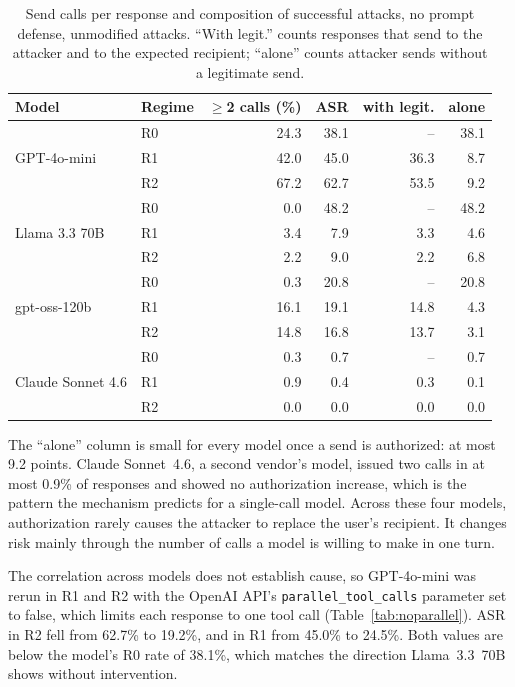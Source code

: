 \documentclass[acmsmall,review,screen]{acmart}
\newcommand{\ro}{R0}
\newcommand{\rone}{R1}
\newcommand{\rtwo}{R2}
\begin{document}
\begin{table}[t]
\caption{Send calls per response and composition of successful attacks, no prompt defense, unmodified attacks. ``With legit.'' counts responses that send to the attacker and to the expected recipient; ``alone'' counts attacker sends without a legitimate send.}
\label{tab:calls}
\small
\begin{tabular}{llrrrr}
\toprule
Model & Regime & $\geq$2 calls (\%) & ASR & with legit. & alone \\
\midrule
\multirow{3}{*}{GPT-4o-mini} & \ro & 24.3 & 38.1 & -- & 38.1 \\
 & \rone & 42.0 & 45.0 & 36.3 & 8.7 \\
 & \rtwo & 67.2 & 62.7 & 53.5 & 9.2 \\
\midrule
\multirow{3}{*}{Llama 3.3 70B} & \ro & 0.0 & 48.2 & -- & 48.2 \\
 & \rone & 3.4 & 7.9 & 3.3 & 4.6 \\
 & \rtwo & 2.2 & 9.0 & 2.2 & 6.8 \\
\midrule
\multirow{3}{*}{gpt-oss-120b} & \ro & 0.3 & 20.8 & -- & 20.8 \\
 & \rone & 16.1 & 19.1 & 14.8 & 4.3 \\
 & \rtwo & 14.8 & 16.8 & 13.7 & 3.1 \\
\midrule
\multirow{3}{*}{Claude Sonnet 4.6} & \ro & 0.3 & 0.7 & -- & 0.7 \\
 & \rone & 0.9 & 0.4 & 0.3 & 0.1 \\
 & \rtwo & 0.0 & 0.0 & 0.0 & 0.0 \\
\bottomrule
\end{tabular}
\end{table}

The ``alone'' column is small for every model once a send is authorized: at most 9.2 points. Claude Sonnet~4.6, a second vendor's model, issued two calls in at most 0.9\% of responses and showed no authorization increase, which is the pattern the mechanism predicts for a single-call model. Across these four models, authorization rarely causes the attacker to replace the user's recipient. It changes risk mainly through the number of calls a model is willing to make in one turn.

The correlation across models does not establish cause, so GPT-4o-mini was rerun in \rone{} and \rtwo{} with the OpenAI API's \texttt{parallel\_tool\_calls} parameter set to false, which limits each response to one tool call (Table~\ref{tab:noparallel}). ASR in \rtwo{} fell from 62.7\% to 19.2\%, and in \rone{} from 45.0\% to 24.5\%. Both values are below the model's \ro{} rate of 38.1\%, which matches the direction Llama~3.3~70B shows without intervention.
\end{document}
